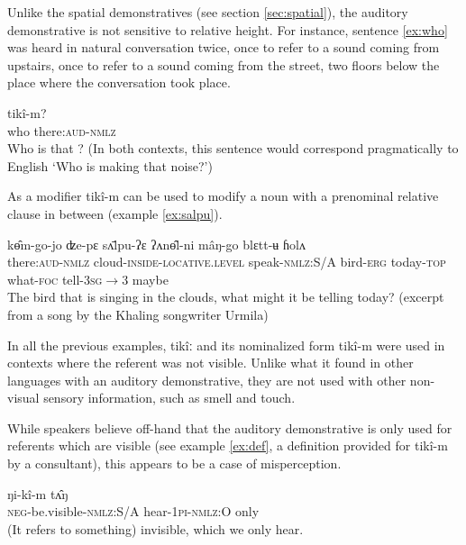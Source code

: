 \documentclass[oldfontcommands,oneside,a4paper,11pt]{article}
\newcommand{\ipa}[1]{{\phon \mbox{#1}}} %
\begin{document}
Unlike the spatial demonstratives (see section \ref{sec:spatial}), the auditory demonstrative is not sensitive to relative height. For instance, sentence \ref{ex:who} was heard in natural conversation twice, once to refer to a sound coming from upstairs, once to refer to a sound coming from the street, two floors below the place where the conversation took place.

\begin{exe}
\ex \label{ex:who}
\gll  	\ipa{sʉ̂ː}  	 	\ipa{tikî-m?}   \\
who there:\textsc{aud}-\textsc{nmlz} \\
\glt Who is that ? (In both contexts, this sentence would correspond pragmatically to English `Who is making that noise?')
\end{exe}

As a modifier \ipa{tikî-m} can be used to modify   a noun with a prenominal     relative clause  in between (example \ref{ex:salpu}).

\begin{exe}
\ex \label{ex:salpu}
\gll    	 	\ipa{tikî-m}   	\ipa{kɵ̂m-go-jo}   	\ipa{ʣe-pɛ}   	\ipa{sʌ̄lpu-ʔɛ}   	\ipa{ʔʌnɵ̂l-ni}   	\ipa{mâŋ-go}   	\ipa{blɛtt-ʉ}   	\ipa{ɦolʌ}   
 \\
 there:\textsc{aud}-\textsc{nmlz} cloud-\textsc{inside-locative.level} speak-\textsc{nmlz:}S/A bird-\textsc{erg} today-\textsc{top} what-\textsc{foc} tell-\textsc{3sg$\rightarrow$3} maybe \\
\glt The bird that is singing in the clouds, what might it be telling today? (excerpt from a song by the Khaling songwriter Urmila)
\end{exe}
 

In all the previous examples, \ipa{tikîː} and its nominalized form \ipa{tikî-m} were used in contexts where the referent was not visible. Unlike what it found in other languages with an auditory demonstrative, they are not used with other non-visual sensory information, such as smell and touch.

While speakers believe off-hand that the auditory demonstrative is only used for referents which are visible (see example  \ref{ex:def}, a definition provided for  \ipa{tikî-m} by a consultant), this appears to be a case of misperception. 
\begin{exe}
\ex \label{ex:def}
\gll  	 	 \ipa{mu-toɔç-pɛ,} \ipa{ŋi-kî-m} \ipa{tʌ̂ŋ}   \\
\textsc{neg}-be.visible-\textsc{nmlz:S/A} hear-\textsc{1pi-nmlz:O} only  \\
\glt (It refers to something) invisible, which we only hear.
\end{exe}
\end{document}
